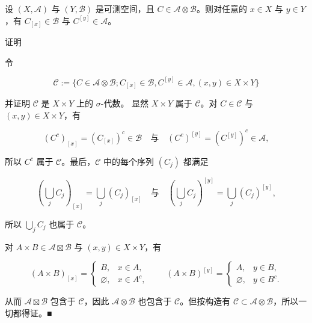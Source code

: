 \begin{proposition}

设 $ (X, \mathcal{A}) $ 与 $ (Y, \mathcal{B}) $ 是可测空间，且 $ C \in \mathcal{A} \otimes \mathcal{B} $。则对任意的 $ x \in X $ 与 $ y \in Y $，有 $ C_{[x]} \in \mathcal{B} $ 与 $ C^{[y]} \in \mathcal{A} $。

证明

\begin{subitems}
\item

令

\[
\mathcal{C} := \{ C \in \mathcal{A} \otimes \mathcal{B} ; C_{[x]} \in \mathcal{B}, C^{[y]} \in \mathcal{A}, (x, y) \in X \times Y \}
\]

并证明 $ \mathcal{C} $ 是 $ X \times Y $ 上的 $ \sigma $-代数。
显然 $ X \times Y $ 属于 $ \mathcal{C} $。对 $ C \in \mathcal{C} $ 与 $ (x, y) \in X \times Y $，有

\[
(C^c)_{[x]} = (C_{[x]})^c \in \mathcal{B} \quad \text{与} \quad (C^c)^{[y]} = (C^{[y]})^c \in \mathcal{A} ,
\]

所以 $ C^c $ 属于 $ \mathcal{C} $。最后，$ \mathcal{C} $ 中的每个序列 $ (C_j) $ 都满足

\[
\left(\bigcup_j C_j\right)_{[x]} = \bigcup_j (C_j)_{[x]} \quad\text{与}\quad \left(\bigcup_j C_j\right)^{[y]} = \bigcup_j (C_j)^{[y]} ,
\]

所以 $ \bigcup_j C_j $ 也属于 $ \mathcal{C} $。

\item

对 $ A\times B\in\mathcal{A}\boxtimes\mathcal{B} $ 与 $ (x,y)\in X\times Y $，有

\begin{equation*}
(A\times B)_{[x]} = \begin{cases} B , & x\in A , \\ \varnothing , & x\in A^{c} , \end{cases} \qquad (A\times B)^{[y]} = \begin{cases} A , & y\in B , \\ \varnothing , & y\in B^{c} . \end{cases}
\end{equation*}

从而 $ \mathcal{A}\boxtimes\mathcal{B} $ 包含于 $ \mathcal{C} $，因此 $ \mathcal{A}\otimes\mathcal{B} $ 也包含于 $ \mathcal{C} $。但按构造有 $ \mathcal{C}\subset\mathcal{A}\otimes\mathcal{B} $，所以一切都得证。\nobreak\hspace{0.35em}■

\end{subitems}

\end{proposition}

